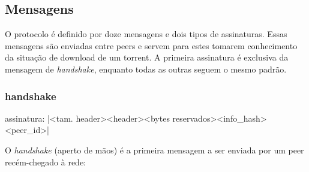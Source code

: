 
\subsection*{Mensagens}

O protocolo é definido por doze mensagens e dois tipos de assinaturas. Essas mensagens
são enviadas entre \glspl*{peer} e servem para estes tomarem conhecimento da situação de
download de um \gls*{torrent}. A primeira assinatura é exclusiva da mensagem de
\emph{handshake}, enquanto todas as outras seguem o mesmo padrão.

\subsubsection*{handshake}

assinatura: \bverb|<tam. header><header><bytes reservados><info_hash><peer_id>|

O \emph{handshake} (aperto de mãos) é a primeira mensagem a ser enviada por um
\gls*{peer} recém-chegado à rede:

